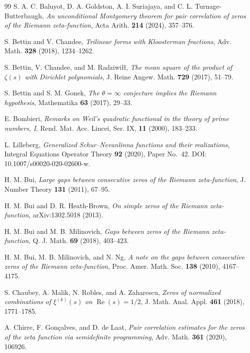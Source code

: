 \begin{thebibliography}{99}
S. A. C. Baluyot, D. A. Goldston, A. I. Suriajaya, and C. L. Turnage-Butterbaugh,
\emph{An unconditional Montgomery theorem for pair correlation of zeros of the Riemann zeta-function},
Acta Arith. \textbf{214} (2024), 357--376.

S. Bettin and V. Chandee,
\emph{Trilinear forms with Kloosterman fractions},
Adv. Math. \textbf{328} (2018), 1234--1262.

S. Bettin, V. Chandee, and M. Radziwi\l\l,
\emph{The mean square of the product of $\zeta(s)$ with Dirichlet polynomials},
J. Reine Angew. Math. \textbf{729} (2017), 51--79.

S. Bettin and S. M. Gonek,
\emph{The $\theta=\infty$ conjecture implies the Riemann hypothesis},
Mathematika \textbf{63} (2017), 29--33.


E. Bombieri,
\emph{Remarks on Weil's quadratic functional in the theory of prime numbers, I},
Rend. Mat. Acc. Lincei, Ser. IX, \textbf{11} (2000), 183--233.

L. Lilleberg,
\emph{Generalized Schur--Nevanlinna functions and their realizations},
Integral Equations Operator Theory \textbf{92} (2020), Paper No.~42.
DOI: 10.1007/s00020-020-02600-w.

H. M. Bui,
\emph{Large gaps between consecutive zeros of the Riemann zeta-function},
J. Number Theory \textbf{131} (2011), 67--95.

H. M. Bui and D. R. Heath-Brown,
\emph{On simple zeros of the Riemann zeta-function},
arXiv:1302.5018 (2013).

H. M. Bui and M. B. Milinovich,
\emph{Gaps between zeros of the Riemann zeta-function},
Q. J. Math. \textbf{69} (2018), 403--423.

H. M. Bui, M. B. Milinovich, and N. Ng,
\emph{A note on the gaps between consecutive zeros of the Riemann zeta-function},
Proc. Amer. Math. Soc. \textbf{138} (2010), 4167--4175.

S. Chaubey, A. Malik, N. Robles, and A. Zaharescu,
\emph{Zeros of normalized combinations of $\xi^{(k)}(s)$ on $\operatorname{Re}(s)=1/2$},
J. Math. Anal. Appl. \textbf{461} (2018), 1771--1785.

A. Chirre, F. Gon\c{c}alves, and D. de Laat,
\emph{Pair correlation estimates for the zeros of the zeta function via semidefinite programming},
Adv. Math. \textbf{361} (2020), 106926.


\end{thebibliography}
